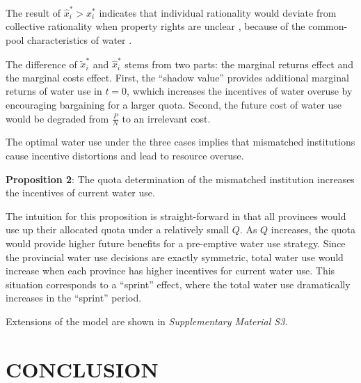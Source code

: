 \documentclass{nsr}
\begin{document}
The result of $\hat x_i^*>x_i^*$ indicates that individual rationality would deviate from collective rationality when property rights are unclear \cite{hardinTragedyCommons2009}, because of the common-pool characteristics of water
\cite{castilla-rhoGroundwaterCommonPool2020,ostromGeneralFrameworkAnalyzing2009}.

The difference of $\widetilde x_i^*$ and $\hat x_i^*$ stems from two parts: the marginal returns effect and the marginal costs effect. First, the “shadow value” provides additional marginal returns of water use in $t=0$, wwhich increases the incentives of water overuse by encouraging bargaining for a larger quota. Second, the future cost of water use would be degraded from $\frac{P}{N}$ to an irrelevant cost.

The optimal water use under the three cases implies that mismatched institutions cause incentive distortions and lead to resource overuse.

\textbf{Proposition 2}: The quota determination of the mismatched institution increases the incentives of current water use.

The intuition for this proposition is straight-forward in that all provinces would use up their allocated quota under a relatively small $Q$. As $Q$ increases, the quota would provide higher future benefits for a pre-emptive water use strategy. Since the provincial water use decisions are exactly symmetric, total water use would increase when each province has higher incentives for current water use. This situation corresponds to a “sprint” effect, where the total water use dramatically increases in the “sprint” period.

Extensions of the model are shown in \textit{Supplementary Material S3}.


\section{CONCLUSION}\label{conclusion}


\appendix
\label{appendix}




\end{document}

